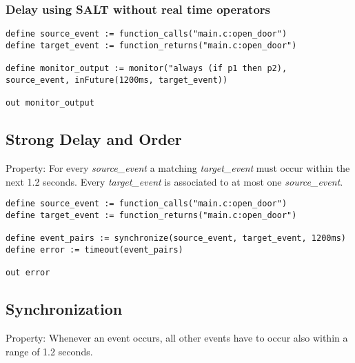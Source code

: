 %
%

\subsubsection{Delay using SALT without real time operators}

\begin{lstlisting}
define source_event := function_calls("main.c:open_door")
define target_event := function_returns("main.c:open_door")

define monitor_output := monitor("always (if p1 then p2), source_event, inFuture(1200ms, target_event))

out monitor_output
\end{lstlisting}

\subsection{Strong Delay and Order}

Property: For every \emph{source\_event} a matching \emph{target\_event} must occur within the next 1.2 seconds.
Every \emph{target\_event} is associated to at most one \emph{source\_event}.

\begin{lstlisting}
define source_event := function_calls("main.c:open_door")
define target_event := function_returns("main.c:open_door")

define event_pairs := synchronize(source_event, target_event, 1200ms)
define error := timeout(event_pairs)

out error
\end{lstlisting}

\subsection{Synchronization}

Property: Whenever an event occurs, all other events have to occur also within a range of 1.2 seconds. 

